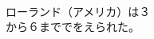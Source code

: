 \documentclass[10pt,b5j]{tarticle} %
\begin{document}
\begin{enumerate}
\begin{minipage}[c]{\blocksize}
        
        \vspace{\linespace}
        \item~\\
        ローランド（アメリカ）は３\\
        から６まででをえられた。
    
    \end{minipage}
\end{enumerate} %
\end{document}
